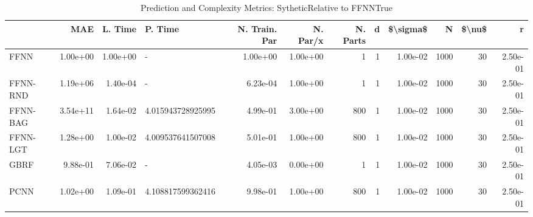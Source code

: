 \begin{table}
\centering
\caption{Prediction and Complexity Metrics: SytheticRelative to FFNNTrue}
\label{tab__Sythetic__Fix_Neurons_QTrue}
\begin{tabular}{lrrlrrrrrrrr}
\toprule
{} &      MAE &  L. Time &            P. Time &  N. Train. Par &  N. Par/x &  N. Parts &  d &  \$\textbackslash sigma\$ &     N &  \$\textbackslash nu\$ &        r \\
\midrule
FFNN     & 1.00e+00 & 1.00e+00 &                  - &       1.00e+00 &  1.00e+00 &         1 &  1 &  1.00e-02 &  1000 &     30 & 2.50e-01 \\
FFNN-RND & 1.19e+06 & 1.40e-04 &                  - &       6.23e-04 &  1.00e+00 &         1 &  1 &  1.00e-02 &  1000 &     30 & 2.50e-01 \\
FFNN-BAG & 3.54e+11 & 1.64e-02 &  4.015943728925995 &       4.99e-01 &  3.00e+00 &       800 &  1 &  1.00e-02 &  1000 &     30 & 2.50e-01 \\
FFNN-LGT & 1.28e+00 & 1.00e-02 &  4.009537641507008 &       5.01e-01 &  1.00e+00 &       800 &  1 &  1.00e-02 &  1000 &     30 & 2.50e-01 \\
GBRF     & 9.88e-01 & 7.06e-02 &                  - &       4.05e-03 &  0.00e+00 &         1 &  1 &  1.00e-02 &  1000 &     30 & 2.50e-01 \\
PCNN     & 1.02e+00 & 1.09e-01 &  4.108817599362416 &       9.98e-01 &  1.00e+00 &       800 &  1 &  1.00e-02 &  1000 &     30 & 2.50e-01 \\
\bottomrule
\end{tabular}
\end{table}
